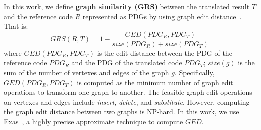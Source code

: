 In this work, we define \textbf{graph similarity (GRS)} between the
translated result $T$ and the reference code $R$ represented as PDGs
by using graph edit distance~\cite{sanfeliu}. That is:
$$GRS(R, T) = 1-\frac{GED(PDG_R, PDG_T)}{size(PDG_R)+ size(PDG_T)}$$ where $GED(PDG_R, PDG_T)$ is the edit distance
between the PDG of the reference code $PDG_R$ and the PDG of the
translated code $PDG_T$; $size(g)$ is the sum of the number of
vertexes and edges of the graph $g$. Specifically, $GED(PDG_R, PDG_T)$
is computed as the minimum number of graph edit operations to
transform one graph to another. The feasible graph edit operations on
vertexes and edges include {\em insert}, {\em delete}, and {\em
  substitute}.  However, computing the graph edit distance between two
graphs is NP-hard.  In this work, we use Exas~\cite{fase09}, a highly
precise approximate technique to compute $GED$.



